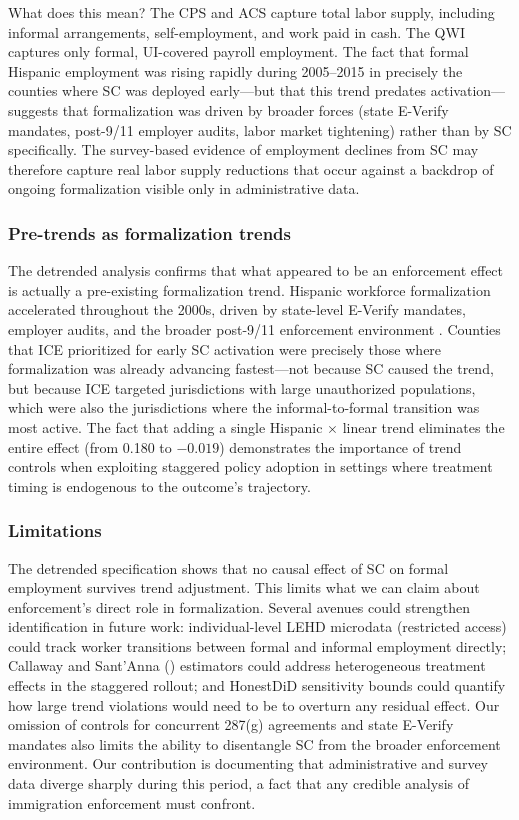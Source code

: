 \documentclass[12pt]{article}
\begin{document}
What does this mean? The CPS and ACS capture total labor supply, including informal arrangements, self-employment, and work paid in cash. The QWI captures only formal, UI-covered payroll employment. The fact that formal Hispanic employment was rising rapidly during 2005--2015 in precisely the counties where SC was deployed early---but that this trend predates activation---suggests that formalization was driven by broader forces (state E-Verify mandates, post-9/11 employer audits, labor market tightening) rather than by SC specifically. The survey-based evidence of employment declines from SC \citep{east2023labor} may therefore capture real labor supply reductions that occur against a backdrop of ongoing formalization visible only in administrative data.

\subsubsection*{Pre-trends as formalization trends} The detrended analysis confirms that what appeared to be an enforcement effect is actually a pre-existing formalization trend. Hispanic workforce formalization accelerated throughout the 2000s, driven by state-level E-Verify mandates, employer audits, and the broader post-9/11 enforcement environment \citep{bohn2015did,orrenius2015behind}. Counties that ICE prioritized for early SC activation were precisely those where formalization was already advancing fastest---not because SC caused the trend, but because ICE targeted jurisdictions with large unauthorized populations, which were also the jurisdictions where the informal-to-formal transition was most active. The fact that adding a single Hispanic $\times$ linear trend eliminates the entire effect (from 0.180 to $-0.019$) demonstrates the importance of trend controls when exploiting staggered policy adoption in settings where treatment timing is endogenous to the outcome's trajectory.

\subsubsection*{Limitations} The detrended specification shows that no causal effect of SC on formal employment survives trend adjustment. This limits what we can claim about enforcement's direct role in formalization. Several avenues could strengthen identification in future work: individual-level LEHD microdata (restricted access) could track worker transitions between formal and informal employment directly; Callaway and Sant'Anna (\citeyear{callaway2021difference}) estimators could address heterogeneous treatment effects in the staggered rollout; and HonestDiD sensitivity bounds \citep{rambachan2023more} could quantify how large trend violations would need to be to overturn any residual effect. Our omission of controls for concurrent 287(g) agreements and state E-Verify mandates also limits the ability to disentangle SC from the broader enforcement environment. Our contribution is documenting that administrative and survey data diverge sharply during this period, a fact that any credible analysis of immigration enforcement must confront.
\end{document}
